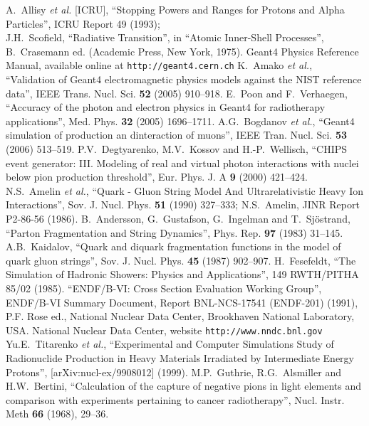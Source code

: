 \documentclass[article]{IEEEtran}
\begin{document}
\begin{thebibliography}{1}
A.~Allisy \emph{et al.} [ICRU], ``Stopping Powers and Ranges for Protons and Alpha Particles'', ICRU Report 49 (1993);\\
J.H.~Scofield, ``Radiative Transition'', in ``Atomic Inner-Shell Processes'',
B.~Crasemann ed. (Academic Press, New York, 1975).
%
Geant4 Physics Reference Manual, available online
at \texttt{http://geant4.cern.ch}
%
K.~Amako \emph{et al.},
``Validation of Geant4 electromagnetic physics models against the NIST reference data'',
IEEE Trans. Nucl. Sci. \textbf{52} (2005) 910--918.
%
E.~Poon and F.~Verhaegen,
``Accuracy of the photon and electron physics in Geant4 for radiotherapy applications'',
Med. Phys. \textbf{32} (2005) 1696--1711.
%
A.G.~Bogdanov \emph{et al.},
``Geant4 simulation of production an dinteraction of muons'',
IEEE Tran. Nucl. Sci. \textbf{53} (2006) 513--519.
%
P.V.~Degtyarenko, M.V.~Kossov and H.-P.~Wellisch,
``CHIPS event generator: III. Modeling of real and virtual photon interactions with nuclei below pion production threshold'',
Eur. Phys. J. A \textbf{9} (2000) 421--424.
%
N.S.~Amelin \emph{et al.}, 
``Quark - Gluon String Model And Ultrarelativistic Heavy Ion Interactions'',
Sov. J. Nucl. Phys. \textbf{51} (1990) 327--333; N.S.~Amelin, JINR Report
P2-86-56 (1986).
%
B.~Andersson, G.~Gustafson, G.~Ingelman and T.~Sj\"ostrand,
``Parton Fragmentation and String Dynamics'',
Phys. Rep. \textbf{97} (1983) 31--145.
%
A.B.~Kaidalov, 
``Quark and diquark fragmentation functions in the model of quark gluon strings'',
Sov. J. Nucl. Phys. \textbf{45} (1987) 902--907.
%
H.~Fesefeldt, ``The Simulation of Hadronic Showers: Physics and Applications'', 149
RWTH/PITHA 85/02 (1985).
%
``ENDF/B-VI: Cross Section Evaluation Working Group'', ENDF/B-VI
Summary Document, Report BNL-NCS-17541 (ENDF-201)
(1991), P.F. Rose ed., National Nuclear Data Center, Brookhaven
National Laboratory, USA.
%
National Nuclear Data Center, website \texttt{http://www.nndc.bnl.gov}
%
Yu.E.~Titarenko \emph{et al.},
``Experimental and Computer Simulations Study of Radionuclide Production
in Heavy Materials Irradiated by Intermediate Energy Protons'',
[arXiv:nucl-ex/9908012] (1999).
%
M.P.~Guthrie, R.G.~Alsmiller and H.W.~Bertini,
``Calculation of the capture of negative pions in light elements and comparison with experiments pertaining to cancer radiotherapy'',
Nucl. Instr. Meth \textbf{66} (1968), 29--36.

\end{thebibliography}
\end{document}
